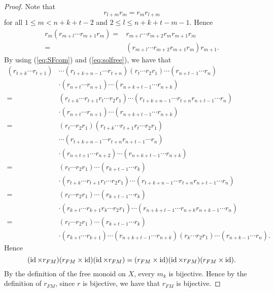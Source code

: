 \begin{proof}
Note that 
\begin{equation}\label{eq:SFcom}
r_{l+m}r_{m}=r_mr_{l+m}
\end{equation}
for all $1\leq m<n+k+t-2$ and $2\leq l\leq n+k+t-m-1$. Hence
\begin{align}\label{eq:solfree}
r_m(r_{m+l}\cdots r_{m+1}r_m)=&r_{m+l}\cdots r_{m+2}r_mr_{m+1}r_m\nonumber\\
=&(r_{m+l}\cdots r_{m+2}r_{m+1}r_{m})r_{m+1}.
\end{align}
By using (\ref{eq:SFcom}) and (\ref{eq:solfree}), we have that
\begin{align*}
    (r_{t+k}\cdots r_{t+1})&\cdots (r_{t+k+n-1}\cdots r_{t+n})(r_{t}\cdots r_2r_{1})\cdots (r_{n+t-1}\cdots r_{n})\\
    &\cdot (r_{n+t}\cdots r_{n+1})\cdots (r_{n+k+t-1}\cdots r_{n+k})\\
    =&(r_{t+k}\cdots r_{t+1}r_t\cdots r_2r_1)\cdots (r_{t+k+n-1}\cdots r_{t+n}r_{n+t-1}\cdots r_{n})\\
    &\cdot (r_{n+t}\cdots r_{n+1})\cdots (r_{n+k+t-1}\cdots r_{n+k})\\
     =&(r_t\cdots r_2r_1)(r_{t+k}\cdots r_{t+1}r_t\cdots r_2r_1)\\
     &\cdots (r_{t+k+n-1}\cdots r_{t+n}r_{n+t-1}\cdots r_{n})\\
    &\cdot (r_{n+t+1}\cdots r_{n+2})\cdots (r_{n+k+t-1}\cdots r_{n+k})\\
    =&(r_t\cdots r_2r_1)\cdots (r_{k+t-1}\cdots r_{k})\\
    &\cdot (r_{t+k}\cdots r_{t+1}r_t\cdots r_2r_1)\cdots (r_{t+k+n-1}\cdots r_{t+n}r_{n+t-1}\cdots r_{n})\\
    =&(r_t\cdots r_2r_1)\cdots (r_{k+t-1}\cdots r_{k})\\
    &\cdot (r_{k+t}\cdots r_{k+1}r_k\cdots r_2r_1)\cdots (r_{n+k+t-1}\cdots r_{n+k}r_{n+k-1}\cdots r_{n})\\
    =&(r_t\cdots r_2r_1)\cdots (r_{k+t-1}\cdots r_{k})\\
    &\cdot (r_{k+t}\cdots r_{k+1})\cdots (r_{n+k+t-1}\cdots r_{n+k})(r_k\cdots r_2r_1)\cdots (r_{n+k-1}\cdots r_{n}).
\end{align*}
Hence
\[(\operatorname{id}\times r_{FM})(r_{FM}\times \operatorname{id})(\operatorname{id}\times r_{FM})=(r_{FM}\times \operatorname{id})(\operatorname{id}\times r_{FM})(r_{FM}\times \operatorname{id}).\]
By the definition of the free monoid on $X$, every $m_k$ is bijective. Hence by the definition of $r_{FM}$, since $r$ is bijective, we have that $r_{FM}$ is bijective.


\end{proof}
